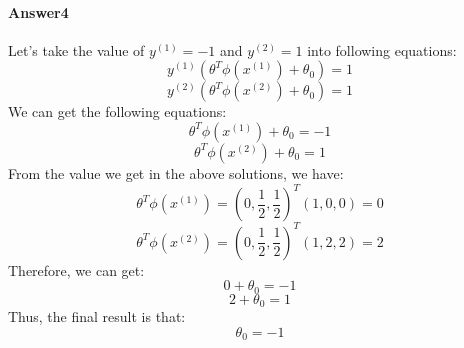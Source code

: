 \documentclass[paper=a4, fontsize=11pt]{scrartcl} %
\numberwithin{equation}{section} %
\numberwithin{figure}{section} %
\numberwithin{table}{section} %
\begin{document}
\paragraph{\textbf{Answer4}}
Let's take the value of $y^{\left ( 1 \right )}=-1$ and $y^{\left ( 2 \right )}=1$ into following equations:
\begin{equation*}
y^{\left ( 1 \right )}\left ( \theta ^{T}\phi \left ( x^{\left ( 1 \right )} \right )+\theta _{0} \right )=1
\end{equation*}
\begin{equation*}
y^{\left ( 2 \right )}\left ( \theta ^{T}\phi \left ( x^{\left ( 2 \right )} \right )+\theta _{0} \right )=1
\end{equation*}
We can get the following equations:
\begin{equation*}
\theta ^{T}\phi \left ( x^{\left ( 1 \right )} \right )+\theta _{0} =-1
\end{equation*}
\begin{equation*}
\theta ^{T}\phi \left ( x^{\left ( 2 \right )} \right )+\theta _{0} =1
\end{equation*}
From the value we get in the above solutions, we have:
\begin{equation*}
\theta ^{T}\phi \left ( x^{\left ( 1 \right )} \right )=\left ( 0, \frac{1}{2}, \frac{1}{2} \right ) ^{T}\left ( 1,0,0 \right )=0
\end{equation*}
\begin{equation*}
\theta ^{T}\phi \left ( x^{\left ( 2 \right )} \right )=\left ( 0, \frac{1}{2}, \frac{1}{2} \right ) ^{T}\left ( 1,2,2 \right )=2
\end{equation*}
Therefore, we can get:
\begin{equation*}
0+\theta _{0} =-1
\end{equation*}
\begin{equation*}
2+\theta _{0} =1
\end{equation*}
Thus, the final result is that:
\begin{equation*}
\theta _{0} =-1
\end{equation*}
\end{document}
